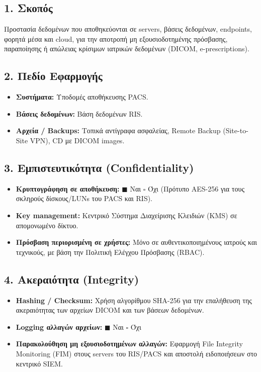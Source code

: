 \documentclass[11pt,a4paper]{article}
\begin{document}
\subsection*{1. Σκοπός}
Προστασία δεδομένων που αποθηκεύονται σε servers, βάσεις δεδομένων, endpoints, φορητά μέσα και cloud, για την αποτροπή μη εξουσιοδοτημένης πρόσβασης, παραποίησης ή απώλειας κρίσιμων ιατρικών δεδομένων (DICOM, e-prescriptions).

\subsection*{2. Πεδίο Εφαρμογής}
\begin{itemize}
    \item \textbf{Συστήματα:} Υποδομές αποθήκευσης PACS.
    \item \textbf{Βάσεις δεδομένων:} Βάση δεδομένων RIS.
    \item \textbf{Αρχεία / Backups:} Τοπικά αντίγραφα ασφαλείας, Remote Backup (Site-to-Site VPN), CD με DICOM images.
\end{itemize}

\subsection*{3. Εμπιστευτικότητα (Confidentiality)}
\begin{itemize}
    \item \textbf{Κρυπτογράφηση σε αποθήκευση:} $\blacksquare$ Ναι \quad $\square$ Όχι (Πρότυπο AES-256 για τους σκληρούς δίσκους/LUNs του PACS και RIS).
    \item \textbf{Key management:} Κεντρικό Σύστημα Διαχείρισης Κλειδιών (KMS) σε απομονωμένο δίκτυο.
    \item \textbf{Πρόσβαση περιορισμένη σε χρήστες:} Μόνο σε αυθεντικοποιημένους ιατρούς και τεχνικούς, με βάση την Πολιτική Ελέγχου Πρόσβασης (RBAC).
\end{itemize}

\subsection*{4. Ακεραιότητα (Integrity)}
\begin{itemize}
    \item \textbf{Hashing / Checksum:} Χρήση αλγορίθμου SHA-256 για την επαλήθευση της ακεραιότητας των αρχείων DICOM και των βάσεων δεδομένων.
    \item \textbf{Logging αλλαγών αρχείων:} $\blacksquare$ Ναι \quad $\square$ Όχι
    \item \textbf{Παρακολούθηση μη εξουσιοδοτημένων αλλαγών:} Εφαρμογή File Integrity Monitoring (FIM) στους servers του RIS/PACS και αποστολή ειδοποιήσεων στο κεντρικό SIEM.
\end{itemize}
\end{document}
